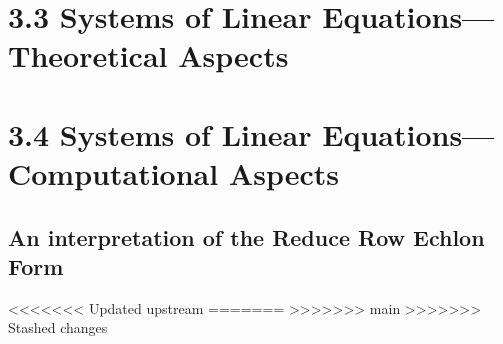 


\section{3.3 Systems of Linear Equations—Theoretical Aspects }









\section{3.4 Systems of Linear Equations—Computational Aspects } 








\subsection{An interpretation of the Reduce Row Echlon Form}







<<<<<<< Updated upstream
=======
>>>>>>> main
>>>>>>> Stashed changes

